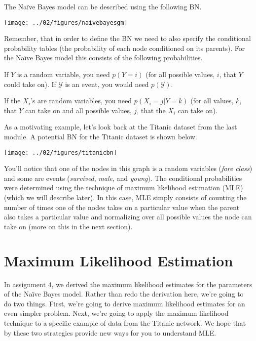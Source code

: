 \documentclass{tufte-handout}
\begin{document}
The Na\"ive Bayes model can be described using the following BN.

\begin{center}
\texttt{[image: ../02/figures/naivebayesgm]}
\end{center}

Remember, that in order to define the BN we need to also specify the conditional probability tables (the probability of each node conditioned on its parents).  For the Na\"ive Bayes model this consists of the following probabilities.

\bi
\item If $Y$ is a random variable, you need $p(Y=i)$ (for all possible values, $i$, that $Y$ could take on).  If $\mathcal{Y}$ is an event, you would need $p(\mathcal{Y})$.
\item If the $X_i$'s are random variables, you need $p(X_i=j | Y=k)$ (for all values, $k$, that $Y$ can take on and all possible values, $j$, that the $X_i$ can take on).
\ei

As a motivating example, let's look back at the Titanic dataset from the last module.  A potential BN for the Titanic dataset is shown below.

\begin{center}
\texttt{[image: ../02/figures/titanicbn]}
\end{center}

You'll notice that one of the nodes in this graph is a random variables (\emph{fare class}) and some are events (\emph{survived}, \emph{male}, and \emph{young}).  The conditional probabilities were determined using the technique of maximum likelihood estimation (MLE) (which we will describe later).  In this case, MLE simply consists of counting the number of times one of the nodes takes on a particular value when the parent also takes a particular value and normalizing over all possible values the node can take on (more on this in the next section).

\section{Maximum Likelihood Estimation}

In assignment 4, we derived the maximum likelihood estimates for the parameters of the Na\"ive Bayes model.  Rather than redo the derivation here, we're going to do two things.  First, we're going to derive maximum likelihood estimates for an even simpler problem.  Next, we're going to apply the maximum likelihood technique to a specific example of data from the Titanic network.  We hope that by these two strategies provide new ways for you to understand MLE.
\end{document}

